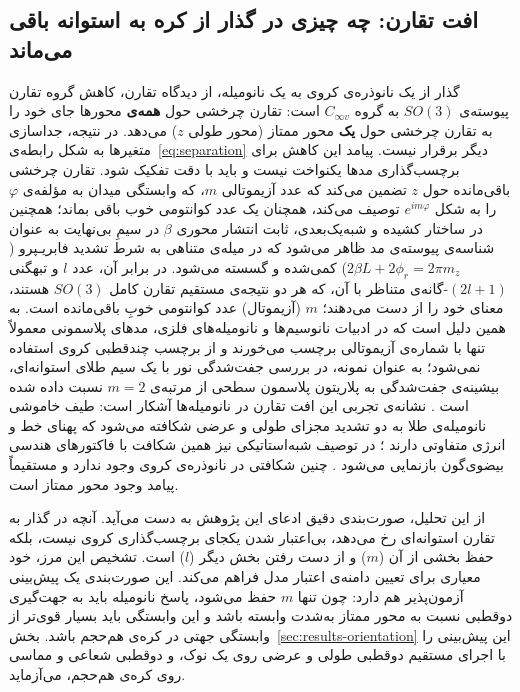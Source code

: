 \subsection{افت تقارن: چه چیزی در گذار از کره به استوانه باقی می‌ماند}
\label{sec:theory-symmetry}

گذار از یک نانوذره‌ی کروی به یک نانومیله، از دیدگاه تقارن، کاهش گروه تقارن
پیوسته‌ی $SO(3)$ به گروه $C_{\infty v}$ است: تقارن چرخشی حول
\textbf{همه‌ی} محورها جای خود را به تقارن چرخشی حول \textbf{یک} محور ممتاز
(محور طولی $z$) می‌دهد. در نتیجه، جداسازی متغیرها به شکل
رابطه‌ی~\eqref{eq:separation} دیگر برقرار نیست. پیامد این کاهش برای
برچسب‌گذاری مدها یکنواخت نیست
و باید با دقت تفکیک شود. تقارن چرخشی باقی‌مانده حول $z$ تضمین می‌کند که
عدد آزیموتالی $m$، که وابستگی میدان به مؤلفه‌ی $\varphi$ را به شکل
$e^{im\varphi}$ توصیف می‌کند، همچنان یک عدد کوانتومی خوب باقی بماند؛
همچنین در ساختار کشیده و شبه‌یک‌بعدی، ثابت انتشار محوری $\beta$ در سیمِ بی‌نهایت به عنوان
شناسه‌ی پیوسته‌ی مد ظاهر می‌شود که در میله‌ی متناهی به شرط تشدید فابریـپرو ($2\beta L + 2\phi_r = 2\pi m_z$)
کمی‌شده و گسسته می‌شود. در برابر آن، عدد $l$ و تبهگنی
$(2l+1)$-گانه‌ی متناظر با آن، که هر دو نتیجه‌ی مستقیم تقارن کامل $SO(3)$
هستند، معنای خود را از دست می‌دهند؛ $m$ (آزیموتال) عدد کوانتومی خوبِ باقی‌مانده است. به همین دلیل است که در ادبیات
نانوسیم‌ها و نانومیله‌های فلزی، مدهای پلاسمونی معمولاً تنها با شماره‌ی
آزیموتالی برچسب می‌خورند و از برچسب چندقطبی کروی استفاده نمی‌شود؛ به عنوان
نمونه، در بررسی جفت‌شدگی نور با یک سیم طلای استوانه‌ای، بیشینه‌ی جفت‌شدگی
به پلاریتون پلاسمون سطحی از مرتبه‌ی $m = 2$ نسبت داده شده است
\cite{lee2008polarization, schmidt2008long}. نشانه‌ی تجربی این افت تقارن
در نانومیله‌ها آشکار است: طیف خاموشی نانومیله‌ی طلا به دو تشدید مجزای
طولی و عرضی شکافته می‌شود که پهنای خط و انرژی متفاوتی دارند
\cite{sonnichsen2002drastic}؛ در توصیف شبه‌استاتیکی نیز همین شکافت با
فاکتورهای هندسی بیضوی‌گون بازنمایی می‌شود
\cite[p.~72]{maier2007plasmonics}. چنین شکافتی در نانوذره‌ی کروی وجود ندارد و
مستقیماً پیامد وجود محور ممتاز است.

از این تحلیل، صورت‌بندی دقیق ادعای این پژوهش به دست می‌آید. آنچه در گذار
به تقارن استوانه‌ای رخ می‌دهد، بی‌اعتبار شدن یکجای برچسب‌گذاری کروی نیست،
بلکه حفظ بخشی از آن ($m$) و از دست رفتن بخش دیگر ($l$) است. تشخیص این
مرز، خود معیاری برای تعیین دامنه‌ی اعتبار مدل فراهم می‌کند. این
صورت‌بندی یک پیش‌بینی آزمون‌پذیر هم دارد: چون تنها $m$ حفظ می‌شود، پاسخ
نانومیله باید به جهت‌گیری دوقطبی نسبت به محور ممتاز به‌شدت وابسته باشد
و این وابستگی باید بسیار قوی‌تر از وابستگی جهتی در کره‌ی هم‌حجم باشد.
بخش~\ref{sec:results-orientation} این پیش‌بینی را با اجرای مستقیم دوقطبی
طولی و عرضی روی یک نوک، و دوقطبی شعاعی و مماسی روی کره‌ی هم‌حجم،
می‌آزماید.

